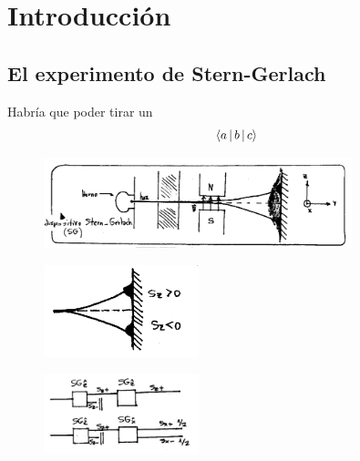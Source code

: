 \documentclass[10pt,oneside]{CBFT_book}
\begin{document}
\chapter{Introducción}


\section{El experimento de Stern-Gerlach}

Habría que poder tirar un 
\[
	\Braket{a | b | c}
\]

\begin{figure}[htb]
	\begin{center}
	\includegraphics[width=0.8\textwidth]{images/teo2_1.pdf}	 
	\end{center}
	\caption{}
\end{figure} 

\begin{figure}[htb]
	\begin{center}
	\includegraphics[width=0.4\textwidth]{images/teo2_2.pdf}	 
	\end{center}
	\caption{}
\end{figure} 

\begin{figure}[htb]
	\begin{center}
	\includegraphics[width=0.4\textwidth]{images/teo2_3.pdf}	 
	\end{center}
	\caption{}
\end{figure} 
\end{document}
